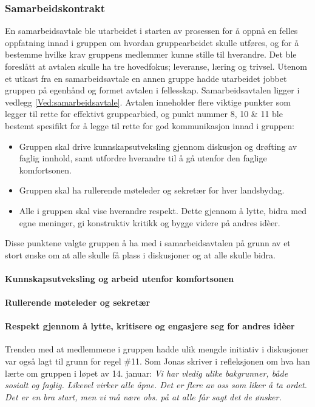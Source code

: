 \subsubsection{Samarbeidskontrakt}
En samarbeidsavtale ble utarbeidet i starten av prosessen for å oppnå en felles oppfatning innad i gruppen om hvordan gruppearbeidet skulle utføres, og for å bestemme hvilke krav gruppens medlemmer kunne stille til hverandre.
Det ble foreslått at avtalen skulle ha tre hovedfokus; leveranse, læring og trivsel.
Utenom et utkast fra en samarbeidsavtale en annen gruppe hadde utarbeidet jobbet gruppen på egenhånd og formet avtalen i fellesskap.
Samarbeidsavtalen ligger i vedlegg \ref{Ved:samarbeidsavtale}.
Avtalen inneholder flere viktige punkter som legger til rette for effektivt gruppearbied, og punkt nummer 8, 10 \& 11 ble bestemt spesifikt for å legge til rette for god kommunikasjon innad i gruppen:
\begin{itemize}
	\item Gruppen skal drive kunnskapsutveksling gjennom diskusjon og drøfting av faglig innhold, samt utfordre hverandre til å gå utenfor den faglige komfortsonen.
	\item Gruppen skal ha rullerende møteleder og sekretær for hver landsbydag.
	\item Alle i gruppen skal vise hverandre respekt. Dette gjennom å lytte, bidra med egne meninger, gi konstruktiv kritikk og bygge videre på andres id\`{e}er.
\end{itemize}

Disse punktene valgte gruppen å ha med i samarbeidsavtalen på grunn av et stort ønske om at alle skulle få plass i diskusjoner og at alle skulle bidra.

\paragraph{Kunnskapsutveksling og arbeid utenfor komfortsonen}



\paragraph{Rullerende møteleder og sekretær}


\paragraph{Respekt gjennom å lytte, kritisere og engasjere seg for andres id\`{e}er}
Trenden med at medlemmene i gruppen hadde ulik mengde initiativ i diskusjoner var også lagt til grunn for regel \#11.
Som Jonas skriver i refleksjonen om hva han lærte om gruppen i løpet av 14. januar:
\textit{
Vi har vledig ulike bakgrunner, både sosialt og faglig. Likevel virker alle åpne. Det er flere av oss som liker å ta ordet. Det er en bra start, men vi må være obs. på at alle får sagt det de ønsker.
}

















